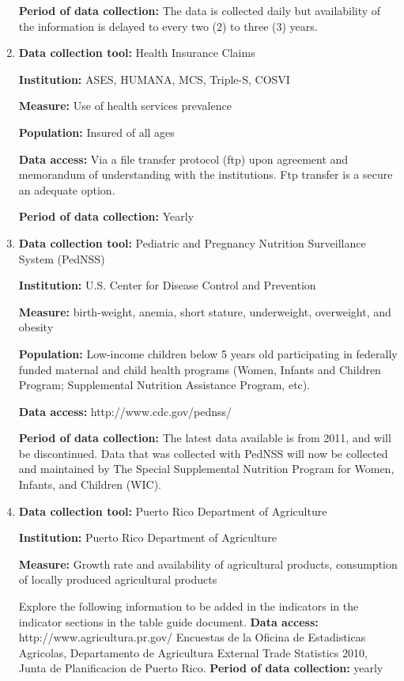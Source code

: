\documentclass[12pt,letterpaper]{report}
\begin{document}
\begin{enumerate}
	\textbf{Period of data collection:} The data is collected daily but availability of the information is delayed to every two (2) to three (3) years.

\item	\textbf{Data collection tool:} Health Insurance Claims

	\textbf{Institution:} ASES, HUMANA, MCS, Triple-S, COSVI

	\textbf{Measure:} Use of health services prevalence

	\textbf{Population:} Insured of all ages

	\textbf{Data access:} Via a file transfer protocol (ftp) upon agreement and memorandum of understanding with the institutions. Ftp transfer is a secure an adequate option.

	\textbf{Period of data collection:}  Yearly
	
\item \textbf{Data collection tool:} Pediatric and Pregnancy Nutrition Surveillance System (PedNSS)

	\textbf{Institution:} U.S. Center for Disease Control and Prevention

	\textbf{Measure:} birth-weight, anemia, short stature, underweight, overweight, and obesity

	\textbf{Population:} Low-income children below 5 years old participating in federally funded maternal and child health programs (Women, Infants and Children Program; Supplemental Nutrition Assistance Program, etc). 

	\textbf{Data access:} http://www.cdc.gov/pednss/

\textbf{Period of data collection:}  The latest data available is from 2011, and will be discontinued. Data that was collected with PedNSS will now be collected and maintained by The Special Supplemental Nutrition Program for Women, Infants, and Children (WIC).

\item \textbf{Data collection tool:} Puerto Rico Department of Agriculture

	\textbf{Institution:} Puerto Rico Department of Agriculture

	\textbf{Measure:} Growth rate and availability of agricultural products, consumption of locally produced agricultural products
	
	Explore the following information to be added in the indicators in the indicator sections in the table guide document.
% 	
% 	
% 	
% 	
		\textbf{Data access:}  http://www.agricultura.pr.gov/ Encuestas de la Oficina de Estadisticas Agricolas, Departamento de Agricultura External Trade Statistics 2010, Junta de Planificacion de Puerto Rico.
\textbf{Period of data collection:}  yearly
	

\end{enumerate}
\end{document}

